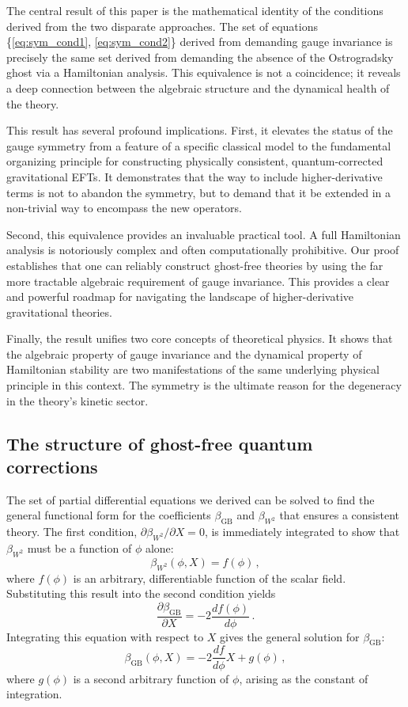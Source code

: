 \documentclass[twocolumn]{aastex631}
\begin{document}
The central result of this paper is the mathematical identity of the conditions derived from the two disparate approaches. The set of equations \{\eqref{eq:sym_cond1}, \eqref{eq:sym_cond2}\} derived from demanding gauge invariance is precisely the same set derived from demanding the absence of the Ostrogradsky ghost via a Hamiltonian analysis. This equivalence is not a coincidence; it reveals a deep connection between the algebraic structure and the dynamical health of the theory.

This result has several profound implications. First, it elevates the status of the gauge symmetry from a feature of a specific classical model to the fundamental organizing principle for constructing physically consistent, quantum-corrected gravitational EFTs. It demonstrates that the way to include higher-derivative terms is not to abandon the symmetry, but to demand that it be extended in a non-trivial way to encompass the new operators.

Second, this equivalence provides an invaluable practical tool. A full Hamiltonian analysis is notoriously complex and often computationally prohibitive. Our proof establishes that one can reliably construct ghost-free theories by using the far more tractable algebraic requirement of gauge invariance. This provides a clear and powerful roadmap for navigating the landscape of higher-derivative gravitational theories.

Finally, the result unifies two core concepts of theoretical physics. It shows that the algebraic property of gauge invariance and the dynamical property of Hamiltonian stability are two manifestations of the same underlying physical principle in this context. The symmetry is the ultimate reason for the degeneracy in the theory's kinetic sector.

\subsection{The structure of ghost-free quantum corrections}

The set of partial differential equations we derived can be solved to find the general functional form for the coefficients $\beta_{\text{GB}}$ and $\beta_{W^2}$ that ensures a consistent theory.
The first condition, $\partial\beta_{W^2}/\partial X = 0$, is immediately integrated to show that $\beta_{W^2}$ must be a function of $\phi$ alone:
\begin{equation}
    \beta_{W^2}(\phi, X) = f(\phi) \,,
\end{equation}
where $f(\phi)$ is an arbitrary, differentiable function of the scalar field. Substituting this result into the second condition yields
\begin{equation}
    \frac{\partial\beta_{\text{GB}}}{\partial X} = -2 \frac{df(\phi)}{d\phi} \,.
\end{equation}
Integrating this equation with respect to $X$ gives the general solution for $\beta_{\text{GB}}$:
\begin{equation}
    \beta_{\text{GB}}(\phi, X) = -2 \frac{df}{d\phi} X + g(\phi) \,,
\end{equation}
where $g(\phi)$ is a second arbitrary function of $\phi$, arising as the constant of integration.
\end{document}
